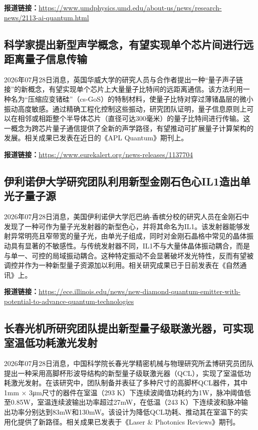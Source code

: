 \documentclass[12pt,a4paper]{ctexart}
\begin{document}
\noindent\textbf{报道链接：}\url{https://www.umdphysics.umd.edu/about-us/news/research-news/2113-ai-quantum.html}

\subsection{ 科学家提出新型声学概念，有望实现单个芯片间进行远距离量子信息传输 }

2026年07月28日消息，英国华威大学的研究人员与合作者提出一种“量子声子链接”的新概念，有望实现单个芯片上大量量子比特间的远距离通信。该方法利用一种名为“压缩应变锗硅”（cs-GoS）的特制材料，使量子比特对穿过薄锗晶层的微小振动高度敏感。通过精确工程化控制这些振动，研究团队证明，量子信息原则上可以在相邻或相距整个半导体芯片（直径可达300毫米）的量子比特间进行传输。这一概念为跨芯片量子通信提供了全新的声学路径，有望推动可扩展量子计算架构的发展。相关成果已发表在近日的《APL Quantum》期刊上。

\noindent\textbf{报道链接：}\url{https://www.eurekalert.org/news-releases/1137704}

\subsection{ 伊利诺伊大学研究团队利用新型金刚石色心IL1造出单光子量子源 }

2026年07月28日消息，美国伊利诺伊大学厄巴纳-香槟分校的研究人员在金刚石中发现了一种可作为量子光发射器的新型色心，并将其命名为IL1。该发射器能够发射异常明亮且窄带宽的量子光，由单光子组成，同时对金刚石晶格中常见的晶体振动具有显著的不敏感性。与传统发射器不同，IL1不与大量体晶体振动耦合，而是与单一、可控的局域振动耦合。这种特定振动不会显著破坏发光特性，反而有望被调控并作为一种新型量子资源加以利用。相关研究成果已于日前发表在《自然通讯》上。

\noindent\textbf{报道链接：}\url{https://ece.illinois.edu/news/new-diamond-quantum-emitter-with-potential-to-advance-quantum-technologies}

\subsection{ 长春光机所研究团队提出新型量子级联激光器，可实现室温低功耗激光发射 }

2026年07月28日消息，中国科学院长春光学精密机械与物理研究所孟博研究员团队提出一种采用高脚杯形波导结构的新型量子级联激光器（QCL），实现了室温低功耗激光发射。在该研究中，团队制备并表征了多种尺寸的高脚杯QCL器件，其中1mm × 3μm尺寸的器件在室温（293 K）下连续波阈值功耗约为1W，脉冲阈值低至0.85W，室温连续波输出功率超过27mW，在低温（243 K）下连续波和脉冲输出功率分别达到83mW和130mW。该设计为降低QCL功耗、推动其在室温下的实用化提供了新路径。相关成果已发表于《Laser \& Photonics Reviews》期刊。
\end{document}
